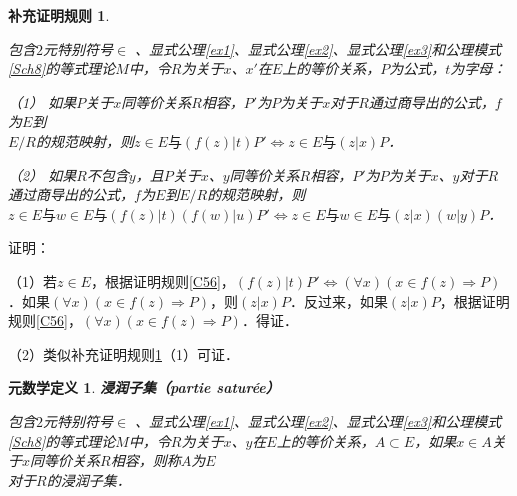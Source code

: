\documentclass[12pt, a4paper, oneside]{book}
\newtheorem{metadef}{元数学定义}
\newtheorem{Ccor}{补充证明规则}
\begin{document}
			\begin{Ccor}\label{Ccor40}
				\hfill\par
				包含$2$元特别符号$\in$ 、显式公理\ref{ex1}、显式公理\ref{ex2}、显式公理\ref{ex3}和公理模式\ref{Sch8}的等式理论$M$中，令$R$为关于$x$、$x'$在$E$上的等价关系，$P$为公式，$t$为字母：
				\par
				（1）	如果$P$关于$x$同等价关系$R$相容，$P'$为$P$为关于$x$对于$R$通过商导出的公式，$f$为$E$到\\$E/R$的规范映射，则$z\in E\text{与}(f(z)|t)P'\Leftrightarrow z\in E\text{与}(z|x)P$．
				\par
				（2）	如果$R$不包含$y$，且$P$关于$x$、$y$同等价关系$R$相容，$P'$为$P$为关于$x$、$y$对于$R$通过商导出的公式，$f$为$E$到$E/R$的规范映射，则$z\in E\text{与}w\in E\text{与}(f(z)|t)(f(w)|u)P'\Leftrightarrow z\in E\text{与}w\in E\text{与}(z|x)(w|y)P$．
			\end{Ccor}
			证明：
			\par
			（1）若$z\in E$，根据证明规则\ref{C56}，$(f(z)|t)P'\Leftrightarrow (\forall x)(x\in f(z)\Rightarrow P)$．如果$(\forall x)(x\in f(z)\Rightarrow P)$，则$(z|x)P$．反过来，如果$(z|x)P$，根据证明规则\ref{C56}，$(\forall x)(x\in f(z)\Rightarrow P)$．得证．
			\par
			（2）类似补充证明规则\ref{Ccor40}（1）可证．

			\begin{metadef}
				\textbf{浸润子集（partie saturée）}
				\par
				包含$2$元特别符号$\in$ 、显式公理\ref{ex1}、显式公理\ref{ex2}、显式公理\ref{ex3}和公理模式\ref{Sch8}的等式理论$M$中，令$R$为关于$x$、$y$在$E$上的等价关系，$A\subset E$，如果$x\in A$关于$x$同等价关系$R$相容，则称$A$为$E$\\对于$R$的浸润子集．
			\end{metadef}
\end{document}
